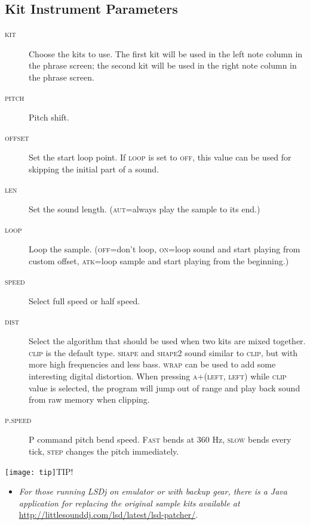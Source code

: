 \subsection{Kit Instrument Parameters}

\begin{figure}[hbtp]
	\begin{center}
	\end{center}
\end{figure}

\begin{description}
	\item[\textsc{kit}] Choose the kits to use. The first kit will be used in the left note column in the phrase screen; the second kit will be used in the right note column in the phrase screen.
	\item[\textsc{pitch}] Pitch shift.
	\item[\textsc{offset}] Set the start loop point. If \textsc{loop} is set to \textsc{off}, this value can be used for skipping the initial part of a sound.
	\item[\textsc{len}] Set the sound length. (\textsc{aut}=always play the sample to its end.)
	\item[\textsc{loop}] Loop the sample. (\textsc{off}=don't loop, \textsc{on}=loop sound and start playing from custom offset, \textsc{atk}=loop sample and start playing from the beginning.)
	\item[\textsc{speed}] Select full speed or half speed.
	\item[\textsc{dist}] Select the algorithm that should be used when two kits are mixed together. \textsc{clip} is the default type. \textsc{shape} and \textsc{shape2} sound similar to \textsc{clip}, but with more high frequencies and less bass. \textsc{wrap} can be used to add some interesting digital distortion. When pressing \textsc{a+(left, left)} while \textsc{clip} value is selected, the program will jump out of range and play back sound from raw memory when clipping.
    \item[\textsc{p.speed}] \textsc{P} command pitch bend speed. \textsc{Fast} bends at 360 Hz, \textsc{slow} bends every tick, \textsc{step} changes the pitch immediately.
\end{description}

\texttt{[image: tip]}TIP!
\begin{itemize}
	\item \textit{For those running LSDj on emulator or with backup gear, there is a Java application for replacing the original sample kits available at} \url{http://littlesounddj.com/lsd/latest/lsd-patcher/}.
\end{itemize}

